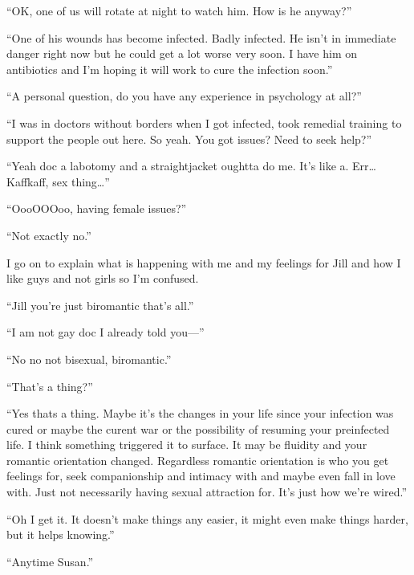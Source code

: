 ``OK, one of us will rotate at night to watch him. How is he anyway?''

``One of his wounds has become infected. Badly infected. He isn't in immediate danger right now but he could get a lot worse very soon. I have him on antibiotics and I'm hoping it will work to cure the infection soon.''

``A personal question, do you have any experience in psychology at all?''

``I was in doctors without borders when I got infected, took remedial training to support the people out here. So yeah. You got issues? Need to seek help?''

``Yeah doc a labotomy and a straightjacket oughtta do me. It's like a. Err\dots{} Kaffkaff, sex thing\dots{}''

``OooOOOoo, having female issues?''

``Not exactly no.''

I go on to explain what is happening with me and my feelings for Jill and how I like guys and not girls so I'm confused.

``Jill you're just biromantic that's all.''

``I am not gay doc I already told you---''

``No no not bisexual, biromantic.''

``That's a thing?''

``Yes thats a thing. Maybe it's the changes in your life since your infection was cured or maybe the curent war or the possibility of resuming your preinfected life. I think something triggered it to surface. It may be fluidity and your romantic orientation changed. Regardless romantic orientation is who you get feelings for, seek companionship and intimacy with and maybe even fall in love with. Just not necessarily having sexual attraction for. It's just how we're wired.''

``Oh I get it. It doesn't make things any easier, it might even make things harder, but it helps knowing.''

``Anytime Susan.''

